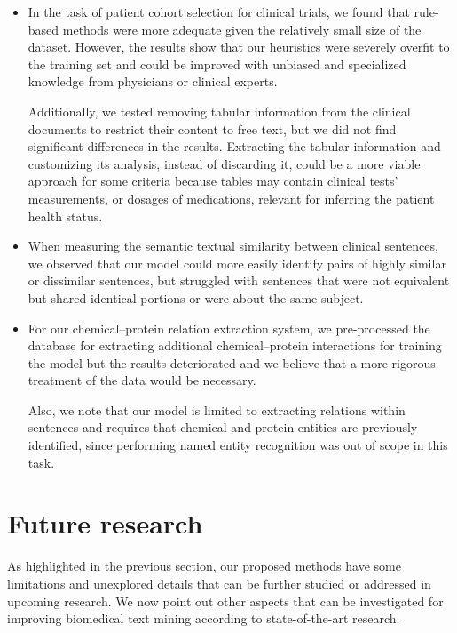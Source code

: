 \begin{itemize}
\item
In the task of patient cohort selection for clinical trials, we found that rule-based methods were more adequate given the relatively small size of the dataset.
However, the results show that our heuristics were severely overfit to the training set and could be improved with unbiased and specialized knowledge from physicians or clinical experts.

Additionally, we tested removing tabular information from the clinical documents to restrict their content to free text, but we did not find significant differences in the results.
Extracting the tabular information and customizing its analysis, instead of discarding it, could be a more viable approach for some criteria because tables may contain clinical tests' measurements, or dosages of medications, relevant for inferring the patient health status.

\item
When measuring the semantic textual similarity between clinical sentences, we observed that our model could more easily identify pairs of highly similar or dissimilar sentences, but struggled with sentences that were not equivalent but shared identical portions or were about the same subject.

\item
For our chemical--protein relation extraction system, we pre-processed the \mbox{} database \parencite{chatraryamontri2017a} for extracting additional chemical--protein interactions for training the model but the results deteriorated and we believe that a more rigorous treatment of the data would be necessary.

Also, we note that our model is limited to extracting relations within sentences and requires that chemical and protein entities are previously identified, since performing named entity recognition was out of scope in this task.

\end{itemize}


\section{Future research}

As highlighted in the previous section, our proposed methods have some limitations and unexplored details that can be further studied or addressed in upcoming research.
We now point out other aspects that can be investigated for improving biomedical text mining according to state-of-the-art research.

